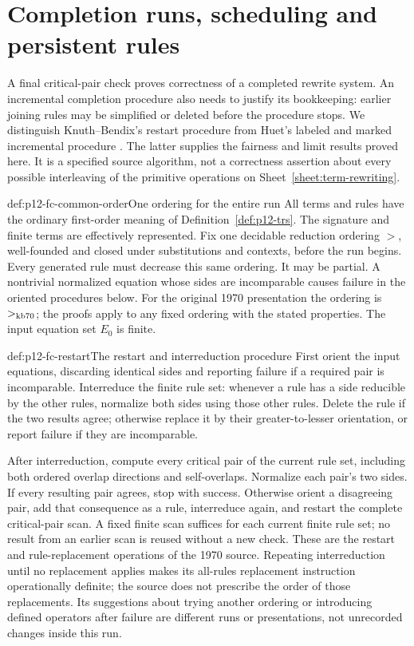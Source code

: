 \section{Completion runs, scheduling and persistent rules}
\label{sec:p12-fair-completion}

A final critical-pair check proves correctness of a completed rewrite
system. An incremental completion procedure also needs to justify its
bookkeeping: earlier joining rules may be simplified or deleted before
the procedure stops. We distinguish Knuth--Bendix's restart procedure
\cite[\S\S5--6]{KnuthBendix1970} from Huet's labeled and marked
incremental procedure \cite[pp.~13--19]{Huet1981CompletionCorrectness}.
The latter supplies the fairness and limit results proved here. It is
a specified source algorithm, not a correctness assertion about every
possible interleaving of the primitive operations on
Sheet~\ref{sheet:term-rewriting}.

\begin{hbconvention}{def:p12-fc-common-order}{One ordering for the entire run}
All terms and rules have the ordinary first-order meaning of
Definition~\ref{def:p12-trs}. The signature and finite terms are
effectively represented. Fix one decidable reduction ordering \(>\),
well-founded and closed under substitutions and contexts, before the
run begins. Every generated rule must decrease this same ordering.
It may be partial. A nontrivial normalized equation whose sides are
incomparable causes failure in the oriented procedures below.
For the original 1970 presentation the ordering is
\(>_{\rm kb70}\); the proofs apply to any fixed ordering with the
stated properties. The input equation set \(E_0\) is finite.
\end{hbconvention}

\begin{hbmethod}{def:p12-fc-restart}{The restart and interreduction procedure}
First orient the input equations, discarding identical sides and
reporting failure if a required pair is incomparable. Interreduce the
finite rule set: whenever a rule has a side reducible by the other
rules, normalize both sides using those other rules. Delete the rule
if the two results agree; otherwise replace it by their greater-to-lesser
orientation, or report failure if they are incomparable.

After interreduction, compute every critical pair of the current rule
set, including both ordered overlap directions and self-overlaps.
Normalize each pair's two sides. If every resulting pair agrees, stop
with success. Otherwise orient a disagreeing pair, add that consequence
as a rule, interreduce again, and restart the complete critical-pair
scan. A fixed finite scan suffices for each current finite rule set;
no result from an earlier scan is reused without a new check.
These are the restart and rule-replacement operations of the 1970
source. Repeating interreduction until no replacement applies makes
its all-rules replacement instruction operationally definite; the
source does not prescribe the order of those replacements.
Its suggestions about trying another ordering or introducing
defined operators after failure are different runs or presentations,
not unrecorded changes inside this run.
\end{hbmethod}

